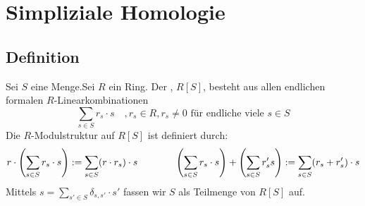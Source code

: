 \section{Simpliziale Homologie} %
\label{sec:3}

\subsection[Definition: Freier $R$-Modul mit Basis $S$]{Definition} %
\label{sub:31}
Sei $S$ eine Menge.Sei $R$ ein Ring. Der , $R[S]$, besteht aus allen endlichen formalen $R$-Linearkombinationen
\[
	\sum_{s \in S} r_s \cdot s \quad , r_s \in R, r_s \not=0 \text{ für endliche viele }s \in S
\]
Die $R$-Modulstruktur auf $R[S]$ ist definiert durch:
\begin{align*}
	r \cdot \enbrace*{\sum_{s\in S} r_s \cdot s} := \sum_{s \in S} (r \cdot r_s) \cdot s \qquad \qquad 
	\enbrace*{\sum_{s \in S} r_s \cdot s} + \enbrace*{\sum_{s \in S} r_s' s} := \sum_{s \in S} (r_s + r_s') \cdot s
\end{align*}
Mittels $s= \sum_{s' \in S} \delta_{s,s'} \cdot s'$ fassen wir $S$ als Teilmenge von $R[S]$ auf.

